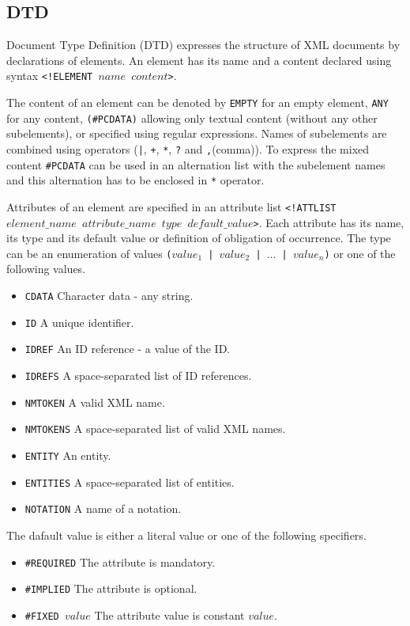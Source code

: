 \subsection{DTD}
Document Type Definition (DTD) expresses the structure of XML documents by declarations of elements. An element has its name and a content declared using syntax \texttt{<!ELEMENT $name$ $content$>}.

The content of an element can be denoted by \texttt{EMPTY} for an empty element, \texttt{ANY} for any content, \texttt{(\#PCDATA)} allowing only textual content (without any other subelements), or specified using regular expressions. Names of subelements are combined using operators (\texttt{|}, \texttt{+}, \texttt{*}, \texttt{?} and \texttt{,}(comma)). To express the mixed content \texttt{\#PCDATA} can be used in an alternation list with the subelement names and this alternation has to be enclosed in \texttt{*} operator.

Attributes of an element are specified in an attribute list \texttt{<!ATTLIST\linebreak $element\_name$ $attribute\_name$ $type$ $default\_value$>}. Each attribute has its name, its type and its default value or definition of obligation of occurrence. The type can be an enumeration of values \texttt{($value_1$ | $value_2$ | $\dots$ | $value_n$)} or one of the following values.

\begin{itemize}
\item \texttt{CDATA} Character data - any string.
\item \texttt{ID} A unique identifier.
\item \texttt{IDREF} An ID reference - a value of the ID.
\item \texttt{IDREFS} A space-separated list of ID references. 
\item \texttt{NMTOKEN}	A valid XML name.
\item \texttt{NMTOKENS} A space-separated list of valid XML names.
\item \texttt{ENTITY} An entity.
\item \texttt{ENTITIES} A space-separated list of entities.
\item \texttt{NOTATION} A name of a notation.
\end{itemize}

The dafault value is either a literal value or one of the following specifiers.

\begin{itemize}
\item \texttt{\#REQUIRED} The attribute is mandatory.
\item \texttt{\#IMPLIED} The attribute is optional.
\item \texttt{\#FIXED $value$} The attribute value is constant $value$.
\end{itemize}

